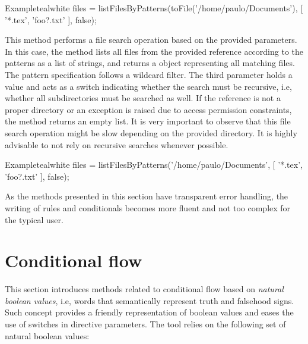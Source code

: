 \begin{description}
\begin{codebox}{Example}{teal}{\icnote}{white}
files = listFilesByPatterns(toFile('/home/paulo/Documents'),
        [ '*.tex', 'foo?.txt' ], false);
\end{codebox}


\item[\mdbox{R}{\parbox{0.59\textwidth}{listFilesByPatterns(String reference,\\\hspace*{1em} List<String> patterns, boolean recursive)}}{List<File>}] This method performs a file search operation based on the provided parameters. In this case, the method lists all files from the provided  reference according to the  patterns as a list of strings, and returns a  object representing all matching files. The pattern specification follows a wildcard filter. The third parameter holds a  value and acts as a switch indicating whether the search must be recursive, i.e, whether all subdirectories must be searched as well. If the reference is not a proper directory or an exception is raised due to access permission constraints, the  method returns an empty list. It is very important to observe that this file search operation might be slow depending on the provided directory. It is highly advisable to not rely on recursive searches whenever possible.

\begin{codebox}{Example}{teal}{\icnote}{white}
files = listFilesByPatterns('/home/paulo/Documents',
        [ '*.tex', 'foo?.txt' ], false);
\end{codebox}
\end{description}

As the methods presented in this section have transparent error handling, the writing of rules and conditionals becomes more fluent and not too complex for the typical user.

\section{Conditional flow}
\label{sec:conditionalflow}

This section introduces methods related to conditional flow based on \emph{natural boolean values}, i.e, words that semantically represent truth and falsehood signs. Such concept provides a friendly representation of boolean values and eases the use of switches in directive parameters. The tool relies on the following set of natural boolean values:

